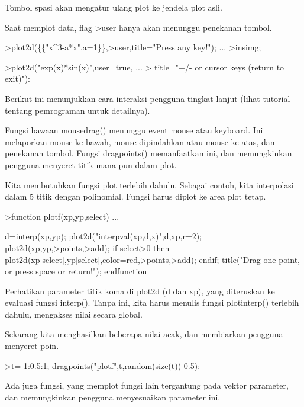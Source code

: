 \documentclass{article}
\begin{document}
\begin{eulernotebook}
\begin{eulercomment}
\begin{eulercomment}
\begin{eulercomment}
\begin{eulercomment}
\begin{eulercomment}
Tombol spasi akan mengatur ulang plot ke jendela plot asli.

Saat memplot data, flag \textgreater{}user hanya akan menunggu penekanan tombol.
\end{eulercomment}
\begin{eulerprompt}
>plot2d(\{\{"x^3-a*x",a=1\}\},>user,title="Press any key!"); ...
>insimg;  
\end{eulerprompt}
\begin{eulerprompt}
>plot2d("exp(x)*sin(x)",user=true, ...
>  title="+/- or cursor keys (return to exit)"):
\end{eulerprompt}
\begin{eulercomment}
Berikut ini menunjukkan cara interaksi pengguna tingkat lanjut (lihat
tutorial tentang pemrograman untuk detailnya).

Fungsi bawaan mousedrag() menunggu event mouse atau keyboard. Ini
melaporkan mouse ke bawah, mouse dipindahkan atau mouse ke atas, dan
penekanan tombol. Fungsi dragpoints() memanfaatkan ini, dan
memungkinkan pengguna menyeret titik mana pun dalam plot.

Kita membutuhkan fungsi plot terlebih dahulu. Sebagai contoh, kita
interpolasi dalam 5 titik dengan polinomial. Fungsi harus diplot ke
area plot tetap.
\end{eulercomment}
\begin{eulerprompt}
>function plotf(xp,yp,select) ...
\end{eulerprompt}
\begin{eulerudf}
    d=interp(xp,yp);
    plot2d("interpval(xp,d,x)";d,xp,r=2);
    plot2d(xp,yp,>points,>add);
    if select>0 then
      plot2d(xp[select],yp[select],color=red,>points,>add);
    endif;
    title("Drag one point, or press space or return!");
  endfunction
\end{eulerudf}
\begin{eulercomment}
Perhatikan parameter titik koma di plot2d (d dan xp), yang diteruskan
ke evaluasi fungsi interp(). Tanpa ini, kita harus menulis fungsi
plotinterp() terlebih dahulu, mengakses nilai secara global.

Sekarang kita menghasilkan beberapa nilai acak, dan membiarkan
pengguna menyeret poin.
\end{eulercomment}
\begin{eulerprompt}
>t=-1:0.5:1; dragpoints("plotf",t,random(size(t))-0.5):
\end{eulerprompt}
\begin{eulercomment}
Ada juga fungsi, yang memplot fungsi lain tergantung pada vektor
parameter, dan memungkinkan pengguna menyesuaikan parameter ini.


\end{eulercomment}
\end{eulercomment}
\end{eulercomment}
\end{eulercomment}
\end{eulercomment}
\end{eulernotebook}
\end{document}
